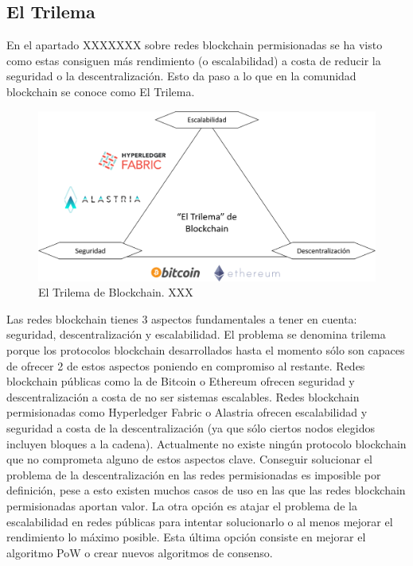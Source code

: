 \subsection{El Trilema}

En el apartado XXXXXXX sobre redes blockchain permisionadas se ha visto como estas consiguen más rendimiento (o escalabilidad) a costa de reducir la seguridad o la descentralización. Esto da paso a lo que en la comunidad blockchain se conoce como El Trilema.\newline

\begin{figure}
	\centering
	\includegraphics[width=1\textwidth]{imagenes/trilemma2.PNG}
	\caption{\label{fig1}El Trilema de Blockchain. XXX}
\end{figure}

Las redes blockchain tienes 3 aspectos fundamentales a tener en cuenta: seguridad, descentralización y escalabilidad. El problema se denomina trilema porque los protocolos blockchain desarrollados hasta el momento sólo son capaces de ofrecer 2 de estos aspectos poniendo en compromiso al restante. Redes blockchain públicas como la de Bitcoin o Ethereum ofrecen seguridad y descentralización a costa de no ser sistemas escalables. Redes blockchain permisionadas como Hyperledger Fabric o Alastria ofrecen escalabilidad y seguridad a costa de la descentralización (ya que sólo ciertos nodos elegidos incluyen bloques a la cadena).
Actualmente no existe ningún protocolo blockchain que no comprometa alguno de estos aspectos clave. Conseguir solucionar el problema de la descentralización en las redes permisionadas es imposible por definición, pese a esto existen muchos casos de uso en las que las redes blockchain permisionadas aportan valor. La otra opción es atajar el problema de la escalabilidad en redes públicas para intentar solucionarlo o al menos mejorar el rendimiento lo máximo posible. Esta última opción consiste en mejorar el algoritmo PoW o crear nuevos algoritmos de consenso.

